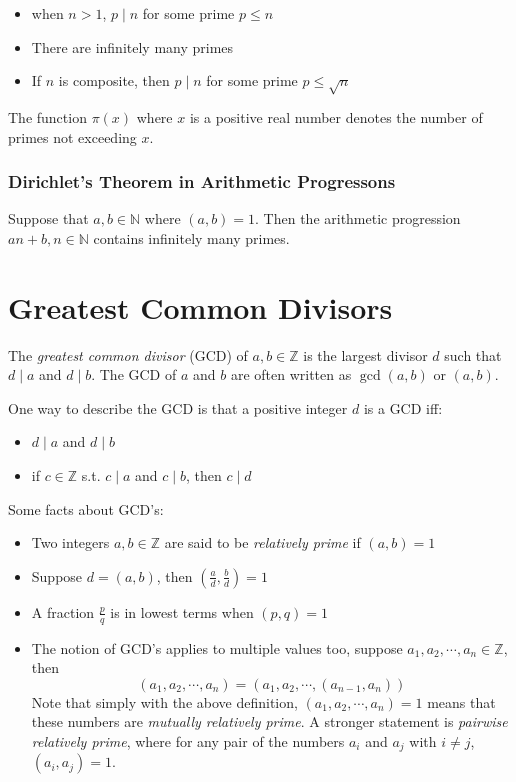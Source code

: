 \documentclass{article}
\begin{document}
\begin{multicols*}{2}
\begin{itemize}
\item when $n > 1$, $p \mid n$ for some prime $p \leq n$
\item There are infinitely many primes
\item If $n$ is composite, then $p \mid n$ for some prime $p \leq \sqrt{n}$
\end{itemize}

The function $\pi(x)$ where $x$ is a positive real number denotes the number of primes not exceeding $x$.

\subsubsection*{Dirichlet's Theorem in Arithmetic Progressons}

Suppose that $a, b \in \mathbb{N}$ where $(a, b) = 1$. Then the arithmetic progression $an+b, n \in \mathbb{N}$ contains infinitely many primes.

\section{Greatest Common Divisors}

The \textit{greatest common divisor} (GCD) of $a, b \in \mathbb{Z}$ is the largest divisor $d$ such that $d \mid a$ and $d \mid b$. The GCD of $a$ and $b$ are often written as $\gcd(a, b)$ or $(a, b)$.

One way to describe the GCD is that a positive integer $d$ is a GCD iff:

\begin{itemize}
\item $d \mid a$ and $d \mid b$
\item if $c \in \mathbb{Z}$ s.t. $c \mid a$ and $c \mid b$, then $c \mid d$
\end{itemize}

Some facts about GCD's:

\begin{itemize}
\item Two integers $a, b \in \mathbb{Z}$ are said to be \textit{relatively prime} if $(a, b) = 1$
\item Suppose $d = ( a, b )$, then $(\frac{a}{d},\frac{b}{d}) = 1$
\item A fraction $\frac{p}{q}$ is in lowest terms when $(p, q) = 1$
\item The notion of GCD's applies to multiple values too, suppose $a_1,a_2, \cdots, a_n \in \mathbb{Z}$, then \[(a_1, a_2, \cdots, a_n) = (a_1, a_2, \cdots, (a_{n-1}, a_n))\]
Note that simply with the above definition, $(a_1, a_2, \cdots, a_n) = 1$ means that these numbers are \textit{mutually relatively prime}. A stronger statement is \textit{pairwise relatively prime}, where for any pair of the numbers $a_i$ and $a_j$ with $i \neq j$, $(a_i, a_j) = 1$.
\end{itemize}


\end{multicols*}
\end{document}
